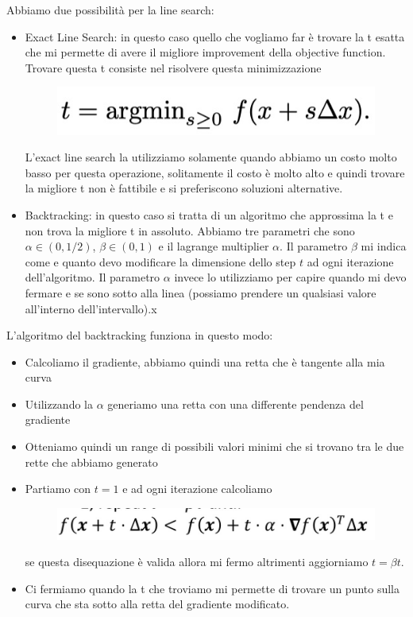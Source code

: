 \documentclass[14pt]{extreport}
\begin{document}
Abbiamo due possibilità per la line search:

\begin{itemize}
\item Exact Line Search: in questo caso quello che vogliamo far è trovare la t esatta che mi permette di avere il migliore improvement della objective
function. Trovare questa t consiste nel risolvere questa minimizzazione \begin{figure}[H]
\centering
\includegraphics[width=0.4\linewidth]{241.jpeg}
\end{figure}
L'exact line search la utilizziamo solamente quando abbiamo un costo molto basso per questa operazione, solitamente il costo è molto alto e quindi
trovare la migliore t non è fattibile e si preferiscono soluzioni alternative.
\item Backtracking: in questo caso si tratta di un algoritmo che approssima la t e non trova la migliore t in assoluto. Abbiamo tre parametri che sono
$\alpha \in (0,1/2)$, $\beta \in (0,1)$ e il lagrange multiplier $\alpha$. Il parametro $\beta$ mi indica come e quanto devo modificare la dimensione
dello step $t$ ad ogni iterazione dell'algoritmo. Il parametro $\alpha$ invece lo utilizziamo per capire quando mi devo fermare e se sono sotto alla
linea (possiamo prendere un qualsiasi valore all'interno dell'intervallo).x
\end{itemize}

L'algoritmo del backtracking funziona in questo modo:
\begin{itemize}
\item Calcoliamo il gradiente, abbiamo quindi una retta che è tangente alla mia curva
\item Utilizzando la $\alpha$ generiamo una retta con una differente pendenza del gradiente
\item Otteniamo quindi un range di possibili valori minimi che si trovano tra le due rette che abbiamo generato
\item Partiamo con $t=1$ e ad ogni iterazione calcoliamo \begin{figure}[H]
\centering
\includegraphics[width=0.7\linewidth]{242.jpeg}
\end{figure} se questa disequazione è valida allora mi fermo altrimenti aggiorniamo $t=\beta t$.
\item Ci fermiamo quando la t che troviamo mi permette di trovare un punto sulla curva che sta sotto alla retta del gradiente modificato.
\end{itemize}
\end{document}
